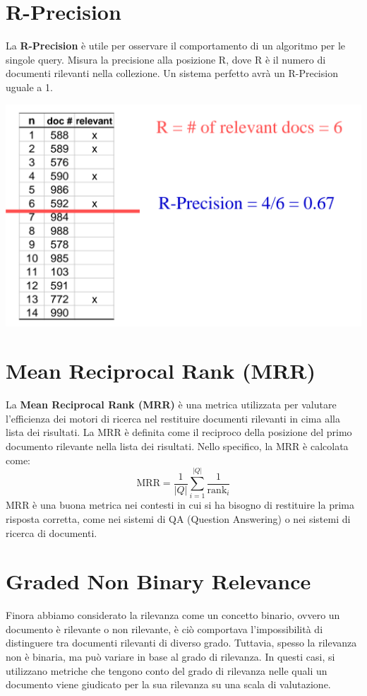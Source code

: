 \documentclass{report}
\begin{document}
	\section{R-Precision}
	La \textbf{R-Precision} è utile per osservare il comportamento di un algoritmo per le singole query. Misura la precisione alla posizione R, dove R è il numero di documenti rilevanti nella collezione. Un sistema perfetto avrà un R-Precision uguale a 1.
	\begin{center}
		\includegraphics[scale=0.5]{assets/r-precision.png}
	\end{center}

	\section{Mean Reciprocal Rank (MRR)}
	La \textbf{Mean Reciprocal Rank (MRR)} è una metrica utilizzata per valutare l'efficienza dei motori di ricerca nel restituire documenti rilevanti in cima alla lista dei risultati. La MRR è definita come il reciproco della posizione del primo documento rilevante nella lista dei risultati. Nello specifico, la MRR è calcolata come:
	\[
		\text{MRR} = \frac{1}{|Q|} \sum_{i=1}^{|Q|} \frac{1}{\text{rank}_i}
	\]
	MRR è una buona metrica nei contesti in cui si ha bisogno di restituire la prima risposta corretta, come nei sistemi di QA (Question Answering) o nei sistemi di ricerca di documenti.  

	\section{Graded Non Binary Relevance}
	Finora abbiamo considerato la rilevanza come un concetto binario, ovvero un documento è rilevante o non rilevante, è ciò comportava l'impossibilità di distinguere tra documenti rilevanti di diverso grado. Tuttavia, spesso la rilevanza non è binaria, ma può variare in base al grado di rilevanza. In questi casi, si utilizzano metriche che tengono conto del grado di rilevanza nelle quali un documento viene giudicato per la sua rilevanza su una scala di valutazione. 
\end{document}
